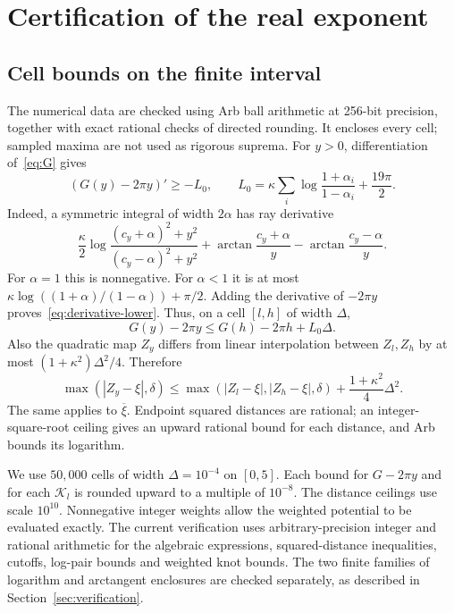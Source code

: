 \section{Certification of the real exponent}\label{sec:real-cert}
\subsection{Cell bounds on the finite interval}
The numerical data are checked using Arb ball arithmetic \cite{Arb} at
256-bit precision, together with exact rational checks of directed rounding.  It encloses every
cell; sampled maxima are not used as rigorous suprema.
For $y>0$, differentiation of~\eqref{eq:G} gives
\begin{equation}\label{eq:derivative-lower}
 (G(y)-2\pi y)'\ge-L_0,\qquad
 L_0=\kappa\sum_i\log\frac{1+\alpha_i}{1-\alpha_i}
                    +\frac{19\pi}{2}.
\end{equation}
Indeed, a symmetric integral of width $2\alpha$ has ray derivative
\[
 \frac\kappa2\log\frac{(c_y+\alpha)^2+y^2}{(c_y-\alpha)^2+y^2}
       +\arctan\frac{c_y+\alpha}{y}-\arctan\frac{c_y-\alpha}{y}.
\]
For $\alpha=1$ this is nonnegative.  For $\alpha<1$ it is at most
$\kappa\log((1+\alpha)/(1-\alpha))+\pi/2$.
Adding the derivative of $-2\pi y$ proves~\eqref{eq:derivative-lower}.
Thus, on a cell $[l,h]$ of width $\Delta$,
\[
 G(y)-2\pi y\le G(h)-2\pi h+L_0\Delta.
\]
Also the quadratic map $Z_y$ differs from linear interpolation between
$Z_l,Z_h$ by at most $(1+\kappa^2)\Delta^2/4$.  Therefore
\begin{equation}\label{eq:distance-cell}
 \max(|Z_y-\xi|,\delta)\le
 \max(|Z_l-\xi|,|Z_h-\xi|,\delta)+\frac{1+\kappa^2}{4}\Delta^2.
\end{equation}
The same applies to $\overline\xi$.  Endpoint squared distances are
rational; an integer-square-root ceiling gives an upward rational
bound for each distance, and Arb bounds its logarithm.

We use $50{,}000$ cells of width $\Delta=10^{-4}$ on $[0,5]$.
Each bound for $G-2\pi y$ and for each $\mathcal K_l$ is rounded
upward to a multiple of $10^{-8}$.  The distance ceilings use scale
$10^{10}$.  Nonnegative integer weights allow the weighted potential
to be evaluated exactly.  The current verification uses arbitrary-precision integer and rational
arithmetic for the algebraic expressions, squared-distance inequalities,
cutoffs, log-pair bounds and weighted knot bounds. The two finite families
of logarithm and arctangent enclosures are checked separately, as described
in Section~\ref{sec:verification}.

